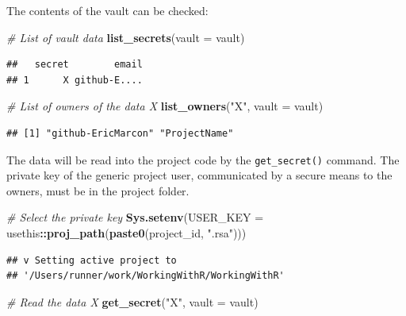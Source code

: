 \documentclass[
  12pt,
  american,
  a4paper,
  extrafontsizes,onecolumn,openright
  ]{memoir}
\newenvironment{Shaded}{\begin{snugshade}}{\end{snugshade}}
\newcommand{\AttributeTok}[1]{\textcolor[rgb]{0.13,0.29,0.53}{#1}}
\newcommand{\CommentTok}[1]{\textcolor[rgb]{0.56,0.35,0.01}{\textit{#1}}}
\newcommand{\FunctionTok}[1]{\textcolor[rgb]{0.13,0.29,0.53}{\textbf{#1}}}
\newcommand{\NormalTok}[1]{#1}
\newcommand{\SpecialCharTok}[1]{\textcolor[rgb]{0.81,0.36,0.00}{\textbf{#1}}}
\newcommand{\StringTok}[1]{\textcolor[rgb]{0.31,0.60,0.02}{#1}}
\begin{document}
\normalsize

The contents of the vault can be checked:

\scriptsize

\begin{Shaded}
\begin{Highlighting}[]
\CommentTok{\# List of vault data}
\FunctionTok{list\_secrets}\NormalTok{(}\AttributeTok{vault =}\NormalTok{ vault)}
\end{Highlighting}
\end{Shaded}

\begin{verbatim}
##   secret        email
## 1      X github-E....
\end{verbatim}

\begin{Shaded}
\begin{Highlighting}[]
\CommentTok{\# List of owners of the data \textquotesingle{}X}
\FunctionTok{list\_owners}\NormalTok{(}\StringTok{"X"}\NormalTok{, }\AttributeTok{vault =}\NormalTok{ vault)}
\end{Highlighting}
\end{Shaded}

\begin{verbatim}
## [1] "github-EricMarcon" "ProjectName"
\end{verbatim}

\normalsize

The data will be read into the project code by the \texttt{get\_secret()} command.
The private key of the generic project user, communicated by a secure means to the owners, must be in the project folder.

\scriptsize

\begin{Shaded}
\begin{Highlighting}[]
\CommentTok{\# Select the private key}
\FunctionTok{Sys.setenv}\NormalTok{(}\AttributeTok{USER\_KEY =}\NormalTok{ usethis}\SpecialCharTok{::}\FunctionTok{proj\_path}\NormalTok{(}\FunctionTok{paste0}\NormalTok{(project\_id, }\StringTok{".rsa"}\NormalTok{)))}
\end{Highlighting}
\end{Shaded}

\begin{verbatim}
## v Setting active project to
## '/Users/runner/work/WorkingWithR/WorkingWithR'
\end{verbatim}

\begin{Shaded}
\begin{Highlighting}[]
\CommentTok{\# Read the data \textquotesingle{}X}
\FunctionTok{get\_secret}\NormalTok{(}\StringTok{"X"}\NormalTok{, }\AttributeTok{vault =}\NormalTok{ vault)}
\end{Highlighting}
\end{Shaded}
\end{document}
